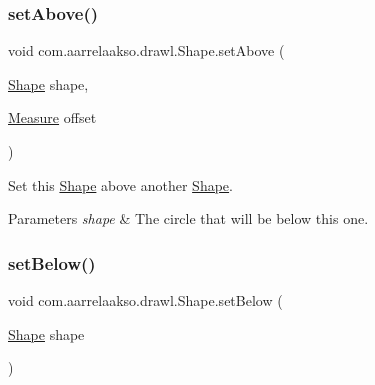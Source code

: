 \mbox{\label{classcom_1_1aarrelaakso_1_1drawl_1_1_shape_aab165a65f7bd1e55a6de7166577725a3}} 
\subsubsection{\texorpdfstring{set\+Above()}{setAbove()}\hspace{0.1cm}{\footnotesize\ttfamily [2/2]}}
{\footnotesize\ttfamily void com.\+aarrelaakso.\+drawl.\+Shape.\+set\+Above (\begin{DoxyParamCaption}\item[{\hyperlink{classcom_1_1aarrelaakso_1_1drawl_1_1_shape}{Shape}}]{shape,  }\item[{\hyperlink{classcom_1_1aarrelaakso_1_1drawl_1_1_measure}{Measure}}]{offset }\end{DoxyParamCaption})\hspace{0.3cm}{\ttfamily [inherited]}}



Set this \hyperlink{classcom_1_1aarrelaakso_1_1drawl_1_1_shape}{Shape} above another \hyperlink{classcom_1_1aarrelaakso_1_1drawl_1_1_shape}{Shape}. 


\begin{DoxyParams}{Parameters}
{\em shape} & The circle that will be below this one. \\
\hline
\end{DoxyParams}
\mbox{\label{classcom_1_1aarrelaakso_1_1drawl_1_1_shape_aa0ec0030515b5096820e4dd030c0b320}} 
\subsubsection{\texorpdfstring{set\+Below()}{setBelow()}\hspace{0.1cm}{\footnotesize\ttfamily [1/2]}}
{\footnotesize\ttfamily void com.\+aarrelaakso.\+drawl.\+Shape.\+set\+Below (\begin{DoxyParamCaption}\item[{\hyperlink{classcom_1_1aarrelaakso_1_1drawl_1_1_shape}{Shape}}]{shape }\end{DoxyParamCaption})\hspace{0.3cm}{\ttfamily [inherited]}}

